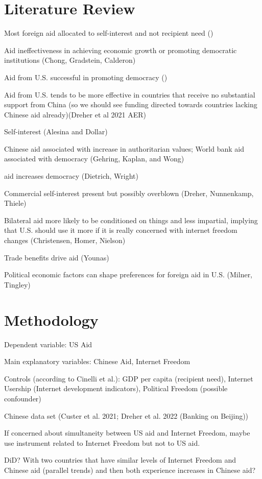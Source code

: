 \documentclass{article}
\begin{document}
\section*{Literature Review}
Most foreign aid allocated to self-interest and not recipient need (\cite{hoeffler2011})

Aid ineffectiveness in achieving economic growth or promoting democratic institutions (Chong, Gradstein, Calderon)

Aid from U.S. successful in promoting democracy (\cite{blair2022})

Aid from U.S. tends to be more effective in countries that receive no substantial support from China (so we should see funding directed towards countries lacking Chinese aid already)(Dreher et al 2021 AER)

Self-interest (Alesina and Dollar)

Chinese aid associated with increase in authoritarian values; World bank aid associated with democracy (Gehring, Kaplan, and Wong)

aid increases democracy (Dietrich, Wright)

Commercial self-interest present but possibly overblown (Dreher, Nunnenkamp, Thiele)

Bilateral aid more likely to be conditioned on things and less impartial, implying that U.S. should use it more if it is really concerned with internet freedom changes (Christensen, Homer, Nielson)

Trade benefits drive aid (Younas)

Political economic factors can shape preferences for foreign aid in U.S. (Milner, Tingley)

\section*{Methodology}
Dependent variable: US Aid

Main explanatory variables: Chinese Aid, Internet Freedom

Controls (according to Cinelli et al.): GDP per capita (recipient need), Internet Usership (Internet development indicators), Political Freedom (possible confounder)

Chinese data set (Custer et al. 2021; Dreher et al. 2022 (Banking on Beijing))

If concerned about simultaneity between US aid and Internet Freedom, maybe use instrument related to Internet Freedom but not to US aid. 

DiD? With two countries that have similar levels of Internet Freedom and Chinese aid (parallel trends) and then both experience increases in Chinese aid?
\end{document}
